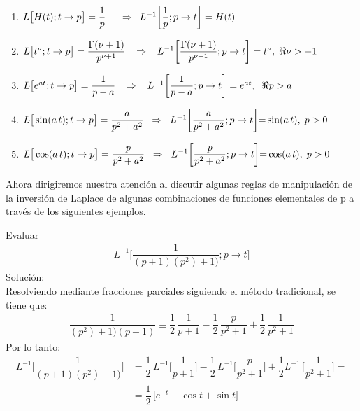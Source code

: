 \begin{enumerate}[label=\alph*)]
\item $ L \big[H(t); t \to p\big] = \dfrac{1}{p} \hspace{0.5cm} \Rightarrow \hspace{0.5em} L^{-1} \bigg[ \dfrac{1}{p}; p \to t \bigg] = H(t)$
\item $ L \big[t^{\nu}; t \to p\big] = \dfrac{\Gamma(\nu + 1)}{p^{\nu + 1}} \hspace{0.3cm} \Rightarrow \hspace{0.3cm} L^{-1} \bigg[ \dfrac{\Gamma(\nu + 1)}{p^{\nu + 1}}; p \to t \bigg] = t^{\nu}, \hspace{0.1cm} \Re{\nu} > - 1$
\item $ L \big[e^{a t}; t \to p\big] = \dfrac{1}{p - a} \hspace{0.3cm} \Rightarrow \hspace{0.3cm} L^{-1} \bigg[ \dfrac{1}{p - a}; p \to t \bigg] = e^{a t}, \hspace{0.2cm} \Re{p} > a$
\item $ L \big[\sin (a \, t); t \to p\big] = \dfrac{a}{p^{2} + a^{2}} \hspace{0.2cm} \Rightarrow \hspace{0.2cm} L^{-1} \bigg[ \dfrac{a}{p^{2} + a^{2}}; p \to t \bigg] {=} \sin (a \, t), \hspace{0.1cm} p > 0$
\item $ L \big[\cos (a \, t); t \to p\big] = \dfrac{p}{p^{2} + a^{2}} \hspace{0.2cm} \Rightarrow \hspace{0.2cm} L^{-1} \bigg[ \dfrac{p}{p^{2} + a^{2}}; p \to t \bigg] {=} \cos (a \, t), \hspace{0.1cm} p > 0$
\end{enumerate}
Ahora dirigiremos nuestra atención al discutir algunas reglas de manipulación de la inversión de Laplace de algunas combinaciones de funciones elementales de p a través de los siguientes ejemplos.
\begin{ejemplo}
Evaluar
\begin{align*}
L^{-1} \bigg[ \dfrac{1}{(p + 1)(p^2) + 1)}; p \to t \bigg]
\end{align*}
Solución:
\\[0.5em]
Resolviendo mediante fracciones parciales siguiendo el método tradicional, se tiene que:
\begin{align*}
\dfrac{1}{(p^2) + 1)(p + 1)} \equiv \dfrac{1}{2} \, \dfrac{1}{p + 1} - \dfrac{1}{2} \, \dfrac{p}{p^{2} + 1} + \dfrac{1}{2} \, \dfrac{1}{p^{2} + 1}
\end{align*}
Por lo tanto:
\begin{align*}
L^{-1} \bigg[ \dfrac{1}{(p + 1)(p^2) + 1)}\bigg] &= \dfrac{1}{2} \, L^{-1} \bigg[ \dfrac{1}{p + 1}\bigg] {-} \dfrac{1}{2} \, L^{-1} \bigg[\dfrac{p}{p^{2} + 1} \bigg] {+} \dfrac{1}{2} L^{-1} \, \bigg[\dfrac{1}{p^{2} + 1} \bigg] = \\[0.5em]
&= \dfrac{1}{2} \, \big[ e^{-t} - \cos t + \sin t \big]
\end{align*}
\end{ejemplo}

